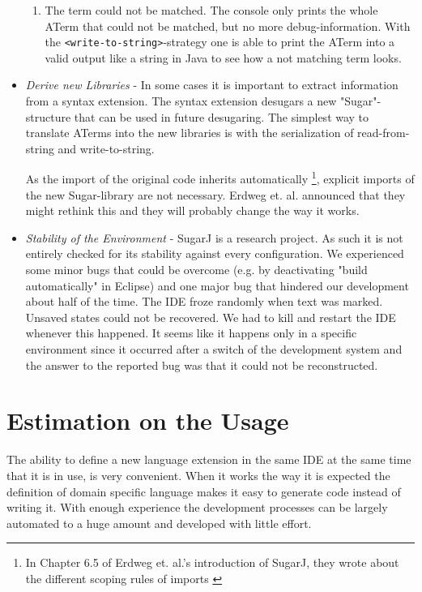 \documentclass{report}
\begin{document}
\begin{itemize}
\begin{enumerate}
 \item The term could not be matched. The console only prints the whole ATerm that could not be matched, but no more debug-information. With the \lstinline{<write-to-string>}-strategy one is able to print the ATerm into a valid output like a string in Java to see how a not matching term looks.
\end{enumerate}
\item \emph{Derive new Libraries} - In some cases it is important to extract information from a syntax extension. The syntax extension desugars a new "Sugar"-structure that can be used in future desugaring. The simplest way to translate ATerms into the new libraries is with the serialization of read-from-string and write-to-string.

As the import of the original code inherits automatically \footnote{In Chapter 6.5 of Erdweg et. al.'s introduction of SugarJ, they wrote about the different scoping rules of imports \cite{Erdweg-SugarJ-2011}}, explicit imports of the new Sugar-library are not necessary. Erdweg et. al. announced that they might rethink this and they will probably change the way it works.
\item \emph{Stability of the Environment} - SugarJ is a research project. As such it is not entirely checked for its stability against every configuration. We experienced some minor bugs that could be overcome (e.g. by deactivating "build automatically" in Eclipse) and one major bug that hindered our development about half of the time. The IDE froze randomly when text was marked. Unsaved states could not be recovered. We had to kill and restart the IDE whenever this happened. It seems like it happens only in a specific environment since it occurred after a switch of the development system and the answer to the reported bug was that it could not be reconstructed.
\end{itemize}

\section{Estimation on the Usage}

The ability to define a new language extension in the same IDE at the same time that it is in use, is very convenient. When it works the way it is expected the definition of domain specific language makes it easy to generate code instead of writing it. With enough experience the development processes can be largely automated to a huge amount and developed with little effort.
\end{document}
